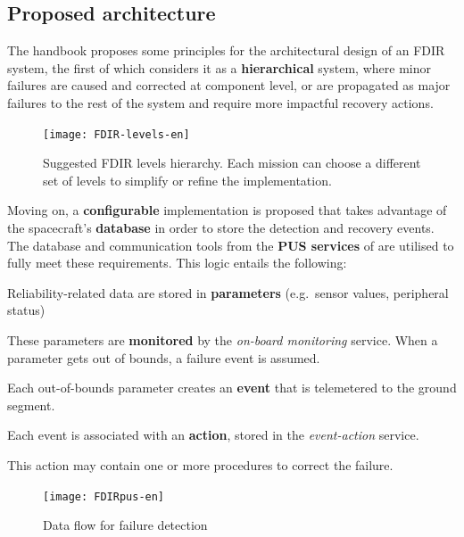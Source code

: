 \documentclass[a4paper,nobib]{tufte-book}
\begin{document}
\egroup
\subsection{Proposed architecture}

The handbook proposes some principles for the architectural design of an \acs{FDIR} system, the first of which considers it as a \textbf{hierarchical} system, where minor failures are caused and corrected at component level, or are propagated as major failures to the rest of the system and require more impactful recovery actions.

\begin{figure}
	\texttt{[image: FDIR-levels-en]}
	\caption[Suggested FDIR levels hierarchy]{Suggested FDIR levels hierarchy. Each mission can choose a different set of levels to simplify or refine the implementation.}
	\label{fig:FDIR-levels}
\end{figure}

Moving on, a \textbf{configurable} implementation is proposed that takes advantage of the spacecraft's \textbf{database} in order to store the detection and recovery events. The database and communication tools from the \textbf{\acs{PUS} services} of  are utilised to fully meet these requirements. This logic entails the following:
\begin{compactenum}
	\item Reliability-related data are stored in \textbf{parameters} (e.g.\ sensor values, peripheral status)
	\item These parameters are \textbf{monitored} by the \emph{on-board monitoring} service. When a parameter gets out of bounds, a failure event is assumed.
	\item Each out-of-bounds parameter creates an \textbf{event} that is telemetered to the ground segment.
	\item Each event is associated with an \textbf{action}, stored in the \emph{event-action} service.
	\item This action may contain one or more procedures to correct the failure.
\end{compactenum}

\begin{figure}[h]
	\texttt{[image: FDIRpus-en]}
	\caption{Data flow for failure detection}
	\label{fig:fdirpus}
\end{figure}
\end{document}
